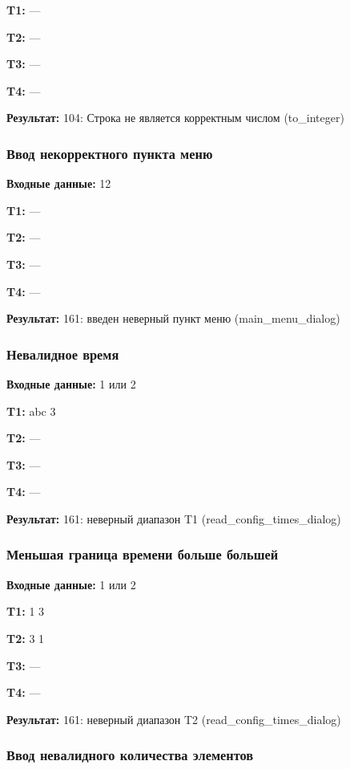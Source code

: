 \documentclass[a4paper,12pt]{extarticle}
\begin{document}
\textbf{T1: }
---

\textbf{T2: }
---

\textbf{T3: }
---

\textbf{T4: }
---

\textbf{Результат: }
104: Строка не является корректным числом (to\_integer)


\subsubsection{Ввод некорректного пункта меню}

\textbf{Входные данные: }
12

\textbf{T1: }
---

\textbf{T2: }
---

\textbf{T3: }
---

\textbf{T4: }
---

\textbf{Результат: }
161: введен неверный пункт меню (main\_menu\_dialog)


\subsubsection{Невалидное время}

\textbf{Входные данные: }
1 или 2

\textbf{T1: }
abc 3

\textbf{T2: }
---

\textbf{T3: }
---

\textbf{T4: }
---


\textbf{Результат: }
161: неверный диапазон T1 (read\_config\_times\_dialog)


\subsubsection{Меньшая граница времени больше большей}

\textbf{Входные данные: }
1 или 2

\textbf{T1: }
1 3

\textbf{T2: }
3 1

\textbf{T3: }
---

\textbf{T4: }
---


\textbf{Результат: }
161: неверный диапазон T2 (read\_config\_times\_dialog)


\subsubsection{Ввод невалидного количества элементов}
\end{document}
